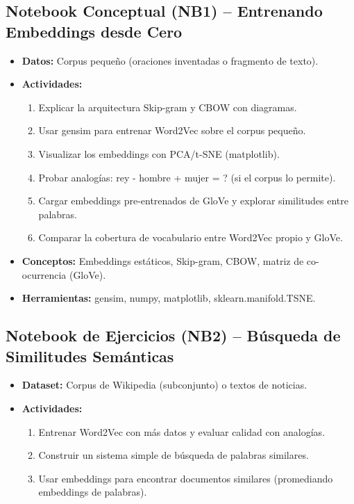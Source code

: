 \documentclass[12pt,a4paper]{article}
\begin{document}
\subsection*{Notebook Conceptual (NB1) – Entrenando Embeddings desde Cero}
\begin{itemize}
    \item \textbf{Datos:} Corpus pequeño (oraciones inventadas o fragmento de texto).
    \item \textbf{Actividades:}
    \begin{enumerate}
        \item Explicar la arquitectura Skip-gram y CBOW con diagramas.
        \item Usar gensim para entrenar Word2Vec sobre el corpus pequeño.
        \item Visualizar los embeddings con PCA/t-SNE (matplotlib).
        \item Probar analogías: rey - hombre + mujer = ? (si el corpus lo permite).
        \item Cargar embeddings pre-entrenados de GloVe y explorar similitudes entre palabras.
        \item Comparar la cobertura de vocabulario entre Word2Vec propio y GloVe.
    \end{enumerate}
    \item \textbf{Conceptos:} Embeddings estáticos, Skip-gram, CBOW, matriz de co-ocurrencia (GloVe).
    \item \textbf{Herramientas:} gensim, numpy, matplotlib, sklearn.manifold.TSNE.
\end{itemize}

\subsection*{Notebook de Ejercicios (NB2) – Búsqueda de Similitudes Semánticas}
\begin{itemize}
    \item \textbf{Dataset:} Corpus de Wikipedia (subconjunto) o textos de noticias.
    \item \textbf{Actividades:}
    \begin{enumerate}
        \item Entrenar Word2Vec con más datos y evaluar calidad con analogías.
        \item Construir un sistema simple de búsqueda de palabras similares.
        \item Usar embeddings para encontrar documentos similares (promediando embeddings de palabras).
    \end{enumerate}
\end{itemize}
\end{document}
